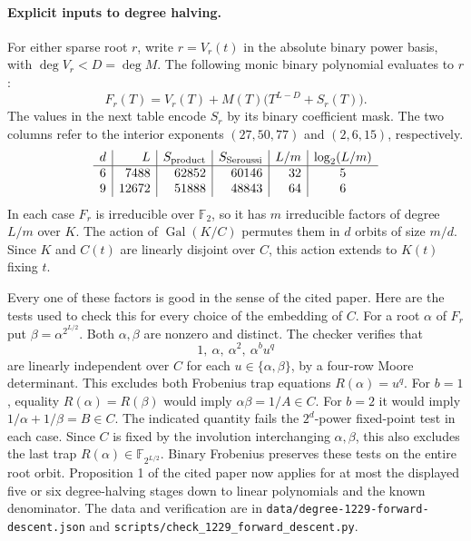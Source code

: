 \documentclass[11pt]{article}
\newcommand{\F}{\mathbb F_2}
\begin{document}
\paragraph{Explicit inputs to degree halving.}
For either sparse root \(r\), write \(r=V_r(t)\) in the absolute binary
power basis, with \(\deg V_r<D=\deg M\). The following monic binary
polynomial evaluates to \(r\):
\[
 F_r(T)=V_r(T)+M(T)\bigl(T^{L-D}+S_r(T)\bigr).
\]
The values in the next table encode \(S_r\) by its binary coefficient
mask. The two columns refer to the interior exponents
\((27,50,77)\) and \((2,6,15)\), respectively.
\[
\begin{array}{c|r|r|r|r|c}
d&L&S_{\rm product}&S_{\rm Seroussi}&L/m&\log_2(L/m)\\\hline
6&7488&62852&60146&32&5\\
9&12672&51888&48843&64&6
\end{array}
\]
In each case \(F_r\) is irreducible over \(\F\), so it has \(m\)
irreducible factors of degree \(L/m\) over \(K\). The action of
\(\operatorname{Gal}(K/C)\) permutes them in \(d\) orbits of size \(m/d\).
Since \(K\) and \(C(t)\) are linearly disjoint over \(C\), this action
extends to \(K(t)\) fixing \(t\).

Every one of these factors is good in the sense of the cited paper.
Here are the tests used to check this for every choice of the embedding
of \(C\). For a root \(\alpha\) of \(F_r\) put
\(\beta=\alpha^{2^{L/2}}\). Both \(\alpha,\beta\) are nonzero and
distinct. The checker verifies that
\[
  1,\ \alpha,\ \alpha^2,\ \alpha^b u^q
\]
are linearly independent over \(C\) for each \(u\in\{\alpha,\beta\}\),
by a four-row Moore determinant. This excludes both Frobenius trap
equations \(R(\alpha)=u^q\).
For \(b=1\), equality \(R(\alpha)=R(\beta)\) would imply
\(\alpha\beta=1/A\in C\). For \(b=2\) it would imply
\(1/\alpha+1/\beta=B\in C\). The indicated quantity fails the
\(2^d\)-power fixed-point test in each case. Since \(C\) is fixed by
the involution interchanging \(\alpha,\beta\), this also excludes the
last trap \(R(\alpha)\in\mathbb F_{2^{L/2}}\). Binary Frobenius
preserves these tests on the entire root orbit.
Proposition 1 of the cited paper now applies for at most the displayed
five or six degree-halving stages down to linear polynomials and the
known denominator. The data and verification are in
\nolinkurl{data/degree-1229-forward-descent.json} and
\nolinkurl{scripts/check_1229_forward_descent.py}.
\end{document}
